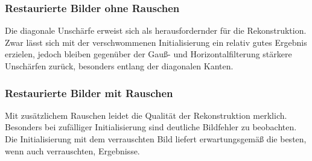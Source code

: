 \subsubsection{Restaurierte Bilder ohne Rauschen}

Die diagonale Unschärfe erweist sich als herausfordernder für die Rekonstruktion. Zwar lässt sich mit der verschwommenen Initialisierung ein relativ gutes Ergebnis erzielen, jedoch bleiben gegenüber der Gauß- und Horizontalfilterung stärkere Unschärfen zurück, besonders entlang der diagonalen Kanten.

\noindent
\begin{minipage}[t]{0.33\textwidth}
\end{minipage}
%
\begin{minipage}[t]{0.33\textwidth}
\end{minipage}
%
\begin{minipage}[t]{0.33\textwidth}
\end{minipage}


\subsubsection{Restaurierte Bilder mit Rauschen}

Mit zusätzlichem Rauschen leidet die Qualität der Rekonstruktion merklich. Besonders bei zufälliger Initialisierung sind deutliche Bildfehler zu beobachten. Die Initialisierung mit dem verrauschten Bild liefert erwartungsgemäß die besten, wenn auch verrauschten, Ergebnisse.

\noindent
\begin{minipage}[t]{0.33\textwidth}
\end{minipage}
%
\begin{minipage}[t]{0.33\textwidth}
\end{minipage}
%
\begin{minipage}[t]{0.33\textwidth}
\end{minipage}


